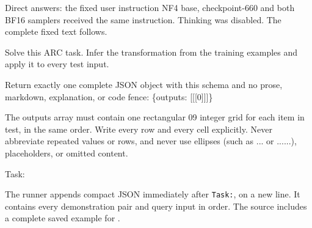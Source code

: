 \begingroup
\begin{frame}[t]{Direct answers: the fixed user instruction}
\med NF4 base, checkpoint-660 and both BF16 samplers received the same instruction. Thinking was disabled. The complete fixed text follows.
\par\vspace{3mm}
{\fontsize{14}{17}\selectfont\ttfamily\raggedright Solve this ARC task. Infer the transformation from the training examples and apply it to every test input.\par}
\vspace{2mm}
{\fontsize{14}{17}\selectfont\ttfamily\raggedright Return exactly one complete JSON object with this schema and no prose, markdown, explanation, or code fence: \{\textquotedbl{}outputs\textquotedbl{}: [[[0]]]\}\par}
\vspace{2mm}
{\fontsize{14}{17}\selectfont\ttfamily\raggedright The \textasciigrave{}outputs\textasciigrave{} array must contain one rectangular 0\textendash{}9 integer grid for each item in \textasciigrave{}test\textasciigrave{}, in the same order. Write every row and every cell explicitly. Never abbreviate repeated values or rows, and never use ellipses (such as \textasciigrave{}...\textasciigrave{} or \textasciigrave{}......\textasciigrave{}), placeholders, or omitted content.\par}
\vspace{2mm}
{\fontsize{14}{17}\selectfont\ttfamily\raggedright Task:\par}
\vspace{2mm}
\vfill\smallbody The runner appends compact JSON immediately after \texttt{Task:}, on a new line. It contains every demonstration pair and query input in order. The source includes a complete saved example for .
\end{frame}

